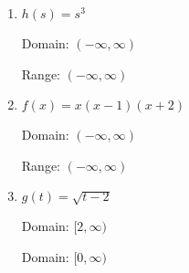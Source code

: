 \documentclass{ximera}
\begin{document}
\begin{enumerate}
\item   

$h(s) = s^3$ 

Domain: $(-\infty, \infty)$ 

Range:  $(-\infty, \infty)$






\item  

$f(x) = x(x-1)(x+2)$

Domain: $(-\infty, \infty)$ 

Range: $(-\infty, \infty)$


 

 





\item

$g(t) = \sqrt{t-2}$

Domain: $[2, \infty)$ 

Domain: $[0, \infty)$ 



\end{enumerate}
\end{document}
